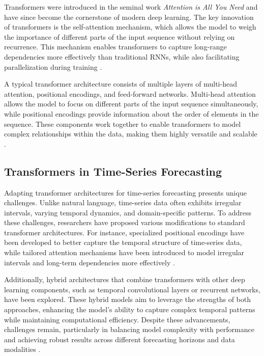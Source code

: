 Transformers were introduced in the seminal work \textit{Attention is All You Need} and have since become the cornerstone of modern deep learning. The key innovation of transformers is the self-attention mechanism, which allows the model to weigh the importance of different parts of the input sequence without relying on recurrence. This mechanism enables transformers to capture long-range dependencies more effectively than traditional RNNs, while also facilitating parallelization during training \cite{Vaswani2017AttentionIA}.

A typical transformer architecture consists of multiple layers of multi-head attention, positional encodings, and feed-forward networks. Multi-head attention allows the model to focus on different parts of the input sequence simultaneously, while positional encodings provide information about the order of elements in the sequence. These components work together to enable transformers to model complex relationships within the data, making them highly versatile and scalable \cite{Vaswani2017AttentionIA}.

\subsection{Transformers in Time-Series Forecasting}

Adapting transformer architectures for time-series forecasting presents unique challenges. Unlike natural language, time-series data often exhibits irregular intervals, varying temporal dynamics, and domain-specific patterns. To address these challenges, researchers have proposed various modifications to standard transformer architectures. For instance, specialized positional encodings have been developed to better capture the temporal structure of time-series data, while tailored attention mechanisms have been introduced to model irregular intervals and long-term dependencies more effectively \cite{kim2024continuoustimelinearpositionalembedding, aguileramartos2024localattentionmechanismboosting}.

Additionally, hybrid architectures that combine transformers with other deep learning components, such as temporal convolutional layers or recurrent networks, have been explored. These hybrid models aim to leverage the strengths of both approaches, enhancing the model's ability to capture complex temporal patterns while maintaining computational efficiency. Despite these advancements, challenges remain, particularly in balancing model complexity with performance and achieving robust results across different forecasting horizons and data modalities \cite{Liu2024EnhancedTS}.

